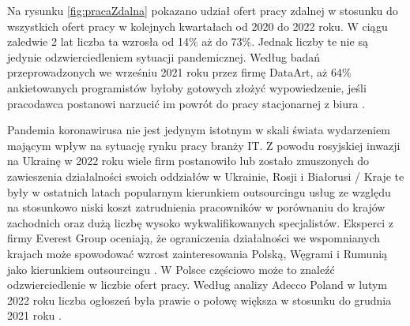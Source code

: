 Na rysunku \ref{fig:pracaZdalna} pokazano udział ofert pracy zdalnej w stosunku do wszystkich ofert pracy w kolejnych kwartałach od 2020 do 2022 roku.
W ciągu zaledwie 2 lat liczba ta wzrosła od 14\% aż do 73\%.
Jednak liczby te nie są jedynie odzwierciedleniem sytuacji pandemicznej. Według badań przeprowadzonych we wrześniu 2021 roku przez firmę DataArt, aż 64\% ankietowanych programistów byłoby gotowych złożyć wypowiedzenie, jeśli pracodawca postanowi narzucić im powrót do pracy stacjonarnej z biura \cite{pasterczyk-2021}.



Pandemia koronawirusa nie jest jedynym istotnym w skali świata wydarzeniem mającym wpływ na sytuację rynku pracy branży IT.
Z powodu rosyjskiej inwazji na Ukrainę w 2022 roku wiele firm postanowiło lub zostało zmuszonych do zawieszenia działalności swoich oddziałów w Ukrainie, Rosji i Białorusi \cite{blaszczak-2022}/
Kraje te były w ostatnich latach popularnym kierunkiem outsourcingu usług ze względu na stosunkowo niski koszt zatrudnienia pracowników w porównaniu do krajów zachodnich oraz dużą liczbę wysoko wykwalifikowanych specjalistów.
Eksperci z firmy Everest Group oceniają, że ograniczenia działalności we wspomnianych krajach może spowodować wzrost zainteresowania Polską, Węgrami i Rumunią jako kierunkiem outsourcingu \cite{overby-2022}.
W Polsce częściowo może to znaleźć odzwierciedlenie w liczbie ofert pracy.
Według analizy Adecco Poland w lutym 2022 roku liczba ogłoszeń była prawie o połowę większa w stosunku do grudnia 2021 roku \cite{blaszczak-2022}.

\thispagestyle{normal}
